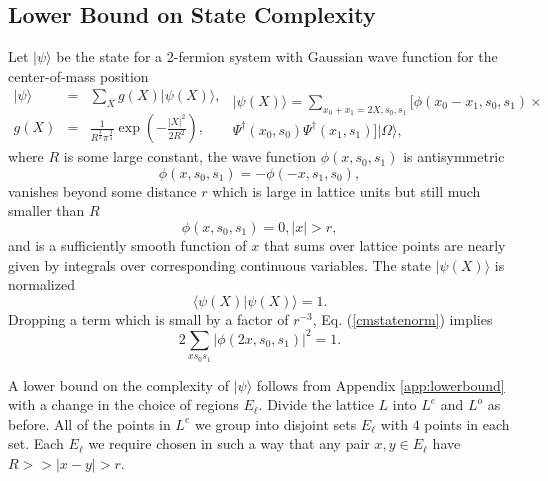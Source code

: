 \documentclass[twocolumn,amsmath,amssymb]{revtex4-1}
\begin{document}
\subsection{\label{sec:lowerboundnew} Lower Bound on State Complexity}

Let $|\psi \rangle $ be the state for a 2-fermion system with Gaussian wave function for the center-of-mass position 
\begin{subequations}
\begin{eqnarray}
\label{netstate}
|\psi \rangle  &=& \sum_X g(X)|\psi(X) \rangle , \\
\label{gaussianstate}
g(X) &=&  \frac{1}{R^\frac{3}{2} \pi^\frac{3}{4}} \exp( -\frac{|X|^2}{2R^2}), 
\end{eqnarray}
\begin{multline}
\label{cmstate}
|\psi(X) \rangle  =  \sum_{x_0 + x_1 = 2X, s_0, s_1}[ \phi(x_0 - x_1, s_0, s_1) \times \\
 \Psi^\dagger( x_0, s_0) \Psi^\dagger(x_1, s_1)] |\Omega \rangle ,
\end{multline}
\end{subequations}
where $R$ is some large constant,
the wave function $\phi(x, s_0, s_1)$ is antisymmetric
\begin{equation}
\label{antisymm}
\phi( x, s_0, s_1) = -\phi( -x, s_1, s_0),
\end{equation}
vanishes beyond some distance
$r$ which is large in lattice units but still much smaller than $R$
\begin{equation}
\label{range}
\phi( x, s_0, s_1) = 0, |x| > r, 
\end{equation}
and is a sufficiently smooth function of $x$ that 
sums over
lattice points are nearly given by integrals over corresponding
continuous variables.
The state $|\psi(X) \rangle $ is normalized
\begin{equation}
\label{cmstatenorm}
 \langle  \psi( X) | \psi( X) \rangle  = 1.
\end{equation}
Dropping a term which is small by a factor of $r^{-3}$, Eq. (\ref{cmstatenorm}) implies
\begin{equation}
\label{cmstatenorm1}
2 \sum_{x s_0 s_1} |\phi(2 x, s_0, s_1)|^2 = 1.
\end{equation}



A lower bound on the complexity of $|\psi \rangle $ follows from Appendix \ref{app:lowerbound} 
with a change in the choice of regions $E_\ell$. Divide the lattice $L$ into $L^e$
and $L^o$ as before. All of the points in $L^e$ we group into disjoint sets $E_\ell$ with $4$ points
in each set. Each $E_\ell$ we require chosen in such a way that any pair $x, y \in E_\ell$ have
$R >> |x - y| > r$. 
\end{document}
